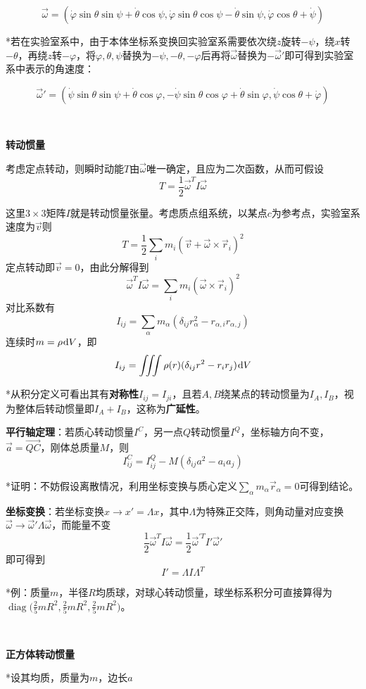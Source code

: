 \documentclass[a4paper,UTF8,fontset=windows]{ctexart}
\newcommand*{\dr}{\hspace{0.07em}\mathrm{d}}
\DeclareMathOperator{\diag}{diag}
\begin{document}
$$\vec{\omega}=(\dot{\varphi}\sin\theta\sin\psi+\dot{\theta}\cos\psi,\dot{\varphi}\sin\theta\cos\psi-\dot{\theta}\sin\psi,\dot{\varphi}\cos\theta+\dot{\psi})$$

*若在实验室系中，由于本体坐标系变换回实验室系需要依次绕$z$旋转$-\psi$，绕$x$转$-\theta$，再绕$z$转$-\varphi$，将$\varphi,\theta,\psi$替换为$-\psi,-\theta,-\varphi$后再将$\vec{\omega}$替换为$-\vec{\omega}'$即可得到实验室系中表示的角速度：

$$\vec{\omega}'=(\dot{\psi}\sin\theta\sin\psi+\dot{\theta}\cos\varphi,-\dot{\psi}\sin\theta\cos\varphi+\dot{\theta}\sin\varphi,\dot{\psi}\cos\theta+\dot{\varphi})$$

\

\textbf{转动惯量}

考虑定点转动，则瞬时动能$T$由$\vec{\omega}$唯一确定，且应为二次函数，从而可假设
$$T=\frac{1}{2}\vec{\omega}^TI\vec{\omega}$$

这里$3\times 3$矩阵$I$就是转动惯量张量。考虑质点组系统，以某点$c$为参考点，实验室系速度为$\vec{v}$则
$$T=\frac{1}{2}\sum_im_i(\vec{v}+\vec{\omega}\times\vec{r}_i)^2$$
定点转动即$\vec{v}=0$，由此分解得到
$$\vec{\omega}^TI\vec{\omega}=\sum_im_i(\vec{\omega}\times\vec{r}_i)^2$$
对比系数有
$$I_{ij}=\sum_\alpha m_\alpha(\delta_{ij}r_\alpha^2-r_{\alpha,i}r_{\alpha,j})$$
连续时$m=\rho\dr V$，即
$$I_{ij}=\iiint\rho(r)(\delta_{ij}r^2-r_ir_j)\dr V$$

*从积分定义可看出其有\textbf{对称性}$I_{ij}=I_{ji}$，且若$A,B$绕某点的转动惯量为$I_A,I_B$，视为整体后转动惯量即$I_A+I_B$，这称为\textbf{广延性}。

\textbf{平行轴定理}：若质心转动惯量$I^C$，另一点$Q$转动惯量$I^Q$，坐标轴方向不变，$\vec{a}=\vec{QC}$，刚体总质量$M$，则
$$I_{ij}^C=I_{ij}^Q-M(\delta_{ij}a^2-a_ia_j)$$

*证明：不妨假设离散情况，利用坐标变换与质心定义$\sum_\alpha m_\alpha\vec{r}_\alpha=0$可得到结论。

\textbf{坐标变换}：若坐标变换$x\to x'=\Lambda x$，其中$\Lambda$为特殊正交阵，则角动量对应变换$\vec{\omega}\to\vec{\omega}'\Lambda\vec{\omega}$，而能量不变
$$\frac{1}{2}\vec{\omega}^TI\vec{\omega}=\frac{1}{2}\vec{\omega}^{\prime T}I'\vec{\omega}'$$
即可得到
$$I'=\Lambda I\Lambda^T$$

*例：质量$m$，半径$R$均质球，对球心转动惯量，球坐标系积分可直接算得为$\diag\big(\frac{2}{5}mR^2,\frac{2}{5}mR^2,\frac{2}{5}mR^2\big)$。

\

\textbf{正方体转动惯量}

*设其均质，质量为$m$，边长$a$
\end{document}
